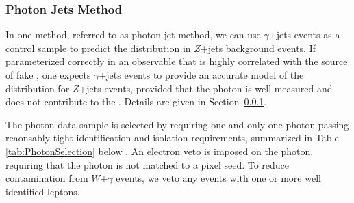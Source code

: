 \subsubsection{Photon Jets Method}
\label{sec:photonjets}

In one method, referred to as photon jet method, we can use
$\gamma$+jets events as a control sample to predict the \met distribution in $Z$+jets
background events. 
If parameterized correctly in an observable that is highly correlated 
with the source of fake \met, one expects $\gamma$+jets events to provide an accurate
model of the \met distribution for $Z$+jets events, provided that the photon
is well measured and does not contribute to the \met. Details are given in Section~\ref{sec:photonjets}. 

The photon data sample is selected by requiring one and only one photon passing reaonsably tight
identification and isolation requirements, summarized in Table \ref{tab:PhotonSelection} below 
\cite{MITHggNote}. 
An electron veto is imposed on the photon, requiring that the photon is not matched to a pixel seed.
To reduce contamination from $W$+$\gamma$ events, we veto any events with one or 
more well identified leptons.

